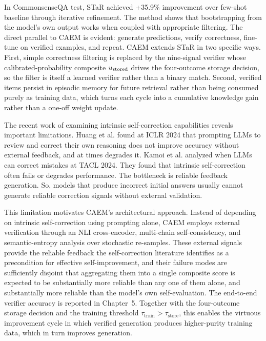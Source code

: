 In CommonsenseQA test, STaR achieved +35.9\% improvement over few-shot baseline through iterative refinement. The method shows that bootstrapping from the model's own output works when coupled with appropriate filtering. The direct parallel to CAEM is evident: generate predictions, verify correctness, fine-tune on verified examples, and repeat. CAEM extends STaR in two specific ways. First, simple correctness filtering is replaced by the nine-signal verifier whose calibrated-probability composite $u_{\text{stored}}$ drives the four-outcome storage decision, so the filter is itself a learned verifier rather than a binary match. Second, verified items persist in episodic memory for future retrieval rather than being consumed purely as training data, which turns each cycle into a cumulative knowledge gain rather than a one-off weight update.

The recent work of examining intrinsic self-correction capabilities reveals important limitations. Huang et al. \cite{huang2024cannot} found at ICLR 2024 that prompting LLMs to review and correct their own reasoning does not improve accuracy without external feedback, and at times degrades it. Kamoi et al. \cite{kamoi-etal-2024-llms} analyzed when LLMs can correct mistakes at TACL 2024. They found that intrinsic self-correction often fails or degrades performance. The bottleneck is reliable feedback generation. So, models that produce incorrect initial answers usually cannot generate reliable correction signals without external validation. 

This limitation motivates CAEM's architectural approach. Instead of depending on intrinsic self-correction using prompting alone, CAEM employs external verification through an NLI cross-encoder, multi-chain self-consistency, and semantic-entropy analysis over stochastic re-samples. These external signals provide the reliable feedback the self-correction literature identifies as a precondition for effective self-improvement, and their failure modes are sufficiently disjoint that aggregating them into a single composite score is expected to be substantially more reliable than any one of them alone, and substantially more reliable than the model's own self-evaluation. The end-to-end verifier accuracy is reported in Chapter~5. Together with the four-outcome storage decision and the training threshold $\tau_{\text{train}} > \tau_{\text{store}}$, this enables the virtuous improvement cycle in which verified generation produces higher-purity training data, which in turn improves generation.

